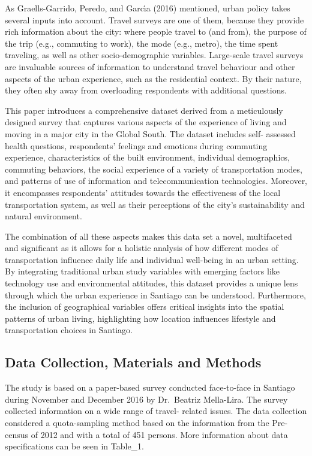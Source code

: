 \documentclass[
]{article}
\begin{document}
As Graells-Garrido, Peredo, and Garcı́a (2016) mentioned, urban policy
takes several inputs into account. Travel surveys are one of them,
because they provide rich information about the city: where people
travel to (and from), the purpose of the trip (e.g., commuting to work),
the mode (e.g., metro), the time spent traveling, as well as other
socio-demographic variables. Large-scale travel surveys are invaluable
sources of information to understand travel behaviour and other aspects
of the urban experience, such as the residential context. By their
nature, they often shy away from overloading respondents with additional
questions.

This paper introduces a comprehensive dataset derived from a
meticulously designed survey that captures various aspects of the
experience of living and moving in a major city in the Global South. The
dataset includes self- assessed health questions, respondents' feelings
and emotions during commuting experience, characteristics of the built
environment, individual demographics, commuting behaviors, the social
experience of a variety of transportation modes, and patterns of use of
information and telecommunication technologies. Moreover, it encompasses
respondents' attitudes towards the effectiveness of the local
transportation system, as well as their perceptions of the city's
sustainability and natural environment.

The combination of all these aspects makes this data set a novel,
multifaceted and significant as it allows for a holistic analysis of how
different modes of transportation influence daily life and individual
well-being in an urban setting. By integrating traditional urban study
variables with emerging factors like technology use and environmental
attitudes, this dataset provides a unique lens through which the urban
experience in Santiago can be understood. Furthermore, the inclusion of
geographical variables offers critical insights into the spatial
patterns of urban living, highlighting how location influences lifestyle
and transportation choices in Santiago.

\hypertarget{data-collection-materials-and-methods}{%
\subsection{Data Collection, Materials and
Methods}\label{data-collection-materials-and-methods}}

The study is based on a paper-based survey conducted face-to-face in
Santiago during November and December 2016 by Dr.~Beatriz Mella-Lira.
The survey collected information on a wide range of travel- related
issues. The data collection considered a quota-sampling method based on
the information from the Pre-census of 2012 and with a total of 451
persons. More information about data specifications can be seen in
Table\_1.
\end{document}
